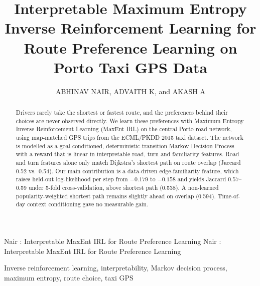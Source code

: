 \documentclass{ieeeaccess}
\begin{document}

\title{Interpretable Maximum Entropy Inverse Reinforcement Learning for Route Preference Learning on Porto Taxi GPS Data}
\author{\uppercase{Abhinav Nair},
\uppercase{Advaith K}, and
\uppercase{Akash A}}
\address[1]{Department of Computer Science Engineering (Artificial Intelligence), Amrita Vishwa Vidyapeetham, Amritapuri, India}

\markboth
{Nair \headeretal: Interpretable MaxEnt IRL for Route Preference Learning}
{Nair \headeretal: Interpretable MaxEnt IRL for Route Preference Learning}


\begin{abstract}
Drivers rarely take the shortest or fastest route, and the preferences behind their choices are never observed directly. We learn these preferences with Maximum Entropy Inverse Reinforcement Learning (MaxEnt IRL) on the central Porto road network, using map-matched GPS trips from the ECML/PKDD 2015 taxi dataset. The network is modelled as a goal-conditioned, deterministic-transition Markov Decision Process with a reward that is linear in interpretable road, turn and familiarity features. Road and turn features alone only match Dijkstra's shortest path on route overlap (Jaccard 0.52 vs.\ 0.54). Our main contribution is a data-driven edge-familiarity feature, which raises held-out log-likelihood per step from $-0.179$ to $-0.158$ and yields Jaccard 0.57--0.59 under 5-fold cross-validation, above shortest path (0.538). A non-learned popularity-weighted shortest path remains slightly ahead on overlap (0.594). Time-of-day context conditioning gave no measurable gain.
\end{abstract}

\begin{keywords}
Inverse reinforcement learning, interpretability, Markov decision process, maximum entropy, route choice, taxi GPS
\end{keywords}


\titlepgskip=-15pt

\maketitle
\end{document}
